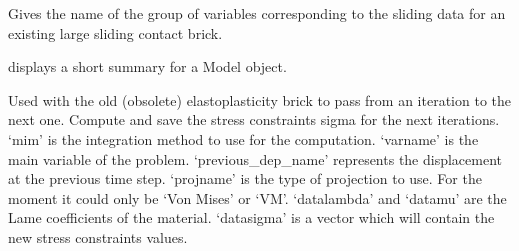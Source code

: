 \documentclass[a4paper,11pt,english]{sphinxmanual}
\begin{document}
\begin{fulllineitems}
\begin{fulllineitems}
\end{fulllineitems}


\begin{fulllineitems}
\label{\detokenize{python/cmdref_Model:getfem.Model.displacement_group_name_of_large_sliding_contact_brick}}
Gives the name of the group of variables corresponding to the
sliding data for an existing large sliding contact brick.

\end{fulllineitems}


\begin{fulllineitems}
\label{\detokenize{python/cmdref_Model:getfem.Model.display}}
displays a short summary for a Model object.

\end{fulllineitems}


\begin{fulllineitems}
\label{\detokenize{python/cmdref_Model:getfem.Model.elastoplasticity_next_iter}}
Used with the old (obsolete) elastoplasticity brick to pass from an
iteration to the next one.
Compute and save the stress constraints sigma for the next iterations.
‘mim’ is the integration method to use for the computation.
‘varname’ is the main variable of the problem.
‘previous\_dep\_name’ represents the displacement at the previous time step.
‘projname’ is the type of projection to use. For the moment it could only be ‘Von Mises’ or ‘VM’.
‘datalambda’ and ‘datamu’ are the Lame coefficients of the material.
‘datasigma’ is a vector which will contain the new stress constraints values.


\end{fulllineitems}
\end{fulllineitems}
\end{document}

